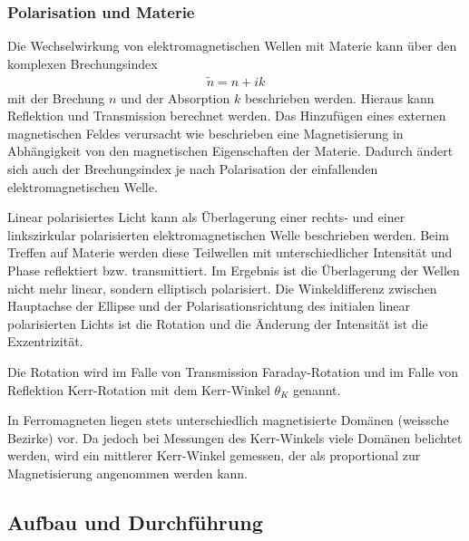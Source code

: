 
  \subsubsection{Polarisation und Materie}
  Die Wechselwirkung von elektromagnetischen Wellen mit Materie kann über den komplexen Brechungsindex
	\begin{align*}
		\tilde{n} = n + ik
	\end{align*}
  mit der Brechung $n$ und der Absorption $k$ beschrieben werden.
  Hieraus kann Reflektion und Transmission berechnet werden.
  Das Hinzufügen eines externen magnetischen Feldes verursacht wie beschrieben eine Magnetisierung in Abhängigkeit von den magnetischen Eigenschaften der Materie.
  Dadurch ändert sich auch der Brechungsindex je nach Polarisation der einfallenden elektromagnetischen Welle.

  Linear polarisiertes Licht kann als Überlagerung einer rechts- und einer linkszirkular polarisierten elektromagnetischen Welle beschrieben werden.
  Beim Treffen auf Materie werden diese Teilwellen mit unterschiedlicher Intensität und Phase reflektiert bzw. transmittiert.
	Im Ergebnis ist die Überlagerung der Wellen nicht mehr linear, sondern elliptisch polarisiert.
	Die Winkeldifferenz zwischen Hauptachse der Ellipse und der Polarisationsrichtung des initialen linear polarisierten Lichts ist die Rotation und die Änderung der Intensität ist die Exzentrizität.

  Die Rotation wird im Falle von Transmission Faraday-Rotation und im Falle von Reflektion Kerr-Rotation mit dem Kerr-Winkel $\theta_K$ genannt.

  In Ferromagneten liegen stets unterschiedlich magnetisierte Domänen (weissche Bezirke) vor.
  Da jedoch bei Messungen des Kerr-Winkels viele Domänen belichtet werden, wird ein mittlerer Kerr-Winkel gemessen, der als proportional zur Magnetisierung angenommen werden kann.

\subsection{Aufbau und Durchführung}

